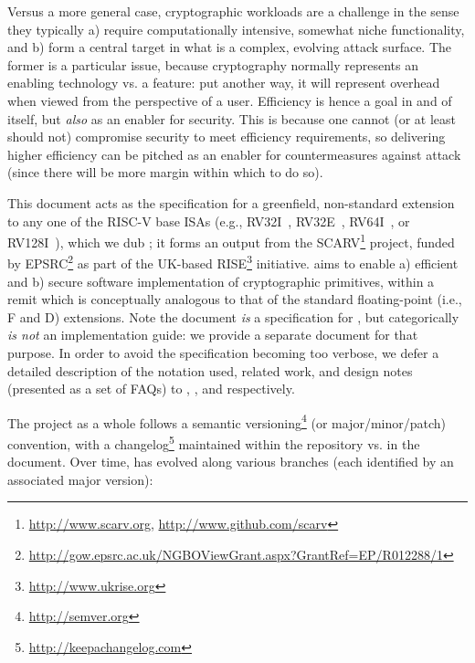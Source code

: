 
Versus a more general case, cryptographic workloads are a challenge in the
sense they typically
a) require computationally intensive, somewhat niche functionality,
   and
b) form a central target in what is a complex, evolving attack surface.
The former is a particular issue, because cryptography normally represents
an enabling technology vs. a feature: put another way, it will represent
overhead when viewed from the perspective of a user.  Efficiency is hence 
a goal in and of itself, but {\em also} as an enabler for security.  This 
is because one cannot (or at least should not) compromise security to meet 
efficiency requirements, so delivering higher efficiency can be pitched as 
an enabler for countermeasures against attack (since there will be more 
margin within which to do so).

This document acts as the specification for a 
greenfield, non-standard extension~\cite[Section 21.1]{SCARV:RV:ISA:I:17} 
to any one of the RISC-V base ISAs
(e.g., RV32I~\cite[Section 2]{SCARV:RV:ISA:I:17}, RV32E~\cite[Section 3]{SCARV:RV:ISA:I:17}, RV64I~\cite[Section 4]{SCARV:RV:ISA:I:17}, or RV128I~\cite[Section 5]{SCARV:RV:ISA:I:17}),
which we dub \XCID; it forms an output from the SCARV\footnote{
\url{http://www.scarv.org}, \url{http://www.github.com/scarv}
} project, funded by EPSRC\footnote{
\url{http://gow.epsrc.ac.uk/NGBOViewGrant.aspx?GrantRef=EP/R012288/1}
} as part of the UK-based RISE\footnote{
\url{http://www.ukrise.org}
} initiative.  
\XCID aims to enable
a) efficient
   and
b) secure
software implementation of cryptographic primitives, within a remit which
is conceptually analogous to that of the standard floating-point (i.e., F
and D) extensions.
Note the document {\em is} a specification for \XCID, but categorically
{\em is not} an implementation guide: we provide a separate document for 
that purpose.  In order to avoid the specification becoming too verbose,
we defer a detailed description of the notation used, related work, and 
design notes (presented as a set of FAQs) to
,
,
and
respectively.  


The project as a whole follows a semantic 
versioning\footnote{
\url{http://semver.org}
} (or major/minor/patch) convention, with a changelog\footnote{
\url{http://keepachangelog.com}
} maintained within the repository vs. in the document.
Over time, \XCID has evolved along various branches 
(each identified by an associated major version):

